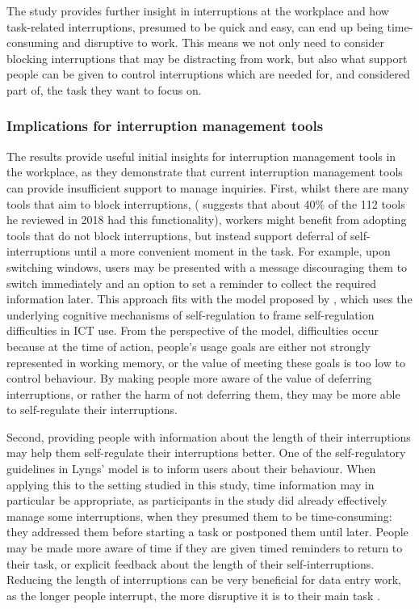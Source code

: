 The study provides further insight in interruptions at the workplace and how task-related interruptions, presumed to be quick and easy, can end up being time-consuming and disruptive to work. This means we not only need to consider blocking interruptions that may be distracting from work, but also what support people can be given to control interruptions which are needed for, and considered part of, the task they want to focus on.

\subsubsection{Implications for interruption management tools}
The results provide useful initial insights for interruption management tools in the workplace, as they demonstrate that current interruption management tools can provide insufficient support to manage inquiries. First, whilst there are many tools that aim to block interruptions, (\citet{Lyngs2018} suggests that about 40\% of the 112 tools he reviewed in 2018 had this functionality), workers might benefit from adopting tools that do not block interruptions, but instead support deferral of self-interruptions until a more convenient moment in the task. For example, upon switching windows, users may be presented with a message discouraging them to switch immediately and an option to set a reminder to collect the required information later. This approach fits with the model proposed by \citet{Lyngs2018}, which uses the underlying cognitive mechanisms of self-regulation to frame self-regulation difficulties in ICT use. From the perspective of the model, difficulties occur because at the time of action, people's usage goals are either not strongly represented in working memory, or the value of meeting these goals is too low to control behaviour. By making people more aware of the value of deferring interruptions, or rather the harm of not deferring them, they may be more able to self-regulate their interruptions. 

Second, providing people with information about the length of their interruptions may help them self-regulate their interruptions better. One of the self-regulatory guidelines in Lyngs' model is to inform users about their behaviour. When applying this to the setting studied in this study, time information may in particular be appropriate, as participants in the study did already effectively manage some interruptions, when they presumed them to be time-consuming: they addressed them before starting a task or postponed them until later. People may be made more aware of time if they are given timed reminders to return to their task, or explicit feedback about the length of their self-interruptions. Reducing the length of interruptions can be very beneficial for data entry work, as the longer people interrupt, the more disruptive it is to their main task \citep{Altmann2017}.

